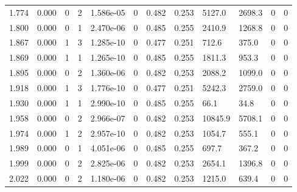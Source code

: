 \documentclass[preview]{standalone}
\begin{document}
{{{\begin{tabular}{L{1.2cm}C{1.2cm} C{0.3cm}C{0.5cm} C{1.4cm}C{1.4cm} C{1.4cm}C{1.4cm} C{1.6cm}C{1.6cm} C{1.6cm}C{1.6cm}}
  1.774  &  0.000  & 0     &  2 &  1.586e-05  & 0  &  0.482&   0.253& 5127.0 & 2698.3   &  0 & 0  \\ 
  1.800  &  0.000  & 0     &  1 &  2.470e-06  & 0  &  0.485&   0.255& 2410.9 & 1268.8   &  0 & 0  \\ 
  1.867  &  0.000  & 1     &  3 &  1.285e-10  & 0  &  0.477&   0.251& 712.6 & 375.0   &  0 & 0  \\ 
  1.869  &  0.000  & 1     &  1 &  1.265e-10  & 0  &  0.485&   0.255& 1811.3 & 953.3   &  0 & 0  \\ 
  1.895  &  0.000  & 0     &  2 &  1.360e-06  & 0  &  0.482&   0.253& 2088.2 & 1099.0   &  0 & 0  \\ 
  1.918  &  0.000  & 1     &  3 &  1.776e-10  & 0  &  0.477&   0.251& 5242.3 & 2759.0   &  0 & 0  \\ 
  1.930  &  0.000  & 1     &  1 &  2.990e-10  & 0  &  0.485&   0.255& 66.1 & 34.8   &  0 & 0  \\ 
  1.958  &  0.000  & 0     &  2 &  2.966e-07  & 0  &  0.482&   0.253& 10845.9 & 5708.1   &  0 & 0  \\ 
  1.974  &  0.000  & 1     &  2 &  2.957e-10  & 0  &  0.482&   0.253& 1054.7 & 555.1   &  0 & 0  \\ 
  1.989  &  0.000  & 0     &  1 &  4.051e-06  & 0  &  0.485&   0.255& 697.7 & 367.2   &  0 & 0  \\ 
  1.999  &  0.000  & 0     &  2 &  2.825e-06  & 0  &  0.482&   0.253& 2654.1 & 1396.8   &  0 & 0  \\ 
  2.022  &  0.000  & 0     &  2 &  1.180e-06  & 0  &  0.482&   0.253& 1215.0 & 639.4   &  0 & 0  \\ 
\hline 
\end{tabular} 

}}}
\end{document}
